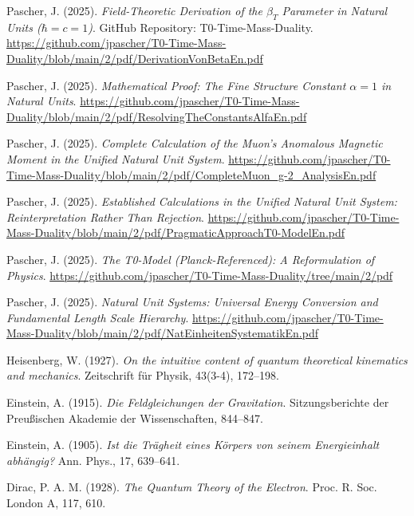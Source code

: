 \documentclass[12pt,a4paper]{article}
\theoremstyle{definition}
\begin{document}
\begin{thebibliography}{99}
		Pascher, J. (2025). 
		\textit{Field-Theoretic Derivation of the $\beta_T$ Parameter in Natural Units ($\hbar = c = 1$)}. 
		GitHub Repository: T0-Time-Mass-Duality.
		\url{https://github.com/jpascher/T0-Time-Mass-Duality/blob/main/2/pdf/DerivationVonBetaEn.pdf}
		
		Pascher, J. (2025).
		\textit{Mathematical Proof: The Fine Structure Constant $\alpha = 1$ in Natural Units}.
		\url{https://github.com/jpascher/T0-Time-Mass-Duality/blob/main/2/pdf/ResolvingTheConstantsAlfaEn.pdf}
		
		Pascher, J. (2025).
		\textit{Complete Calculation of the Muon's Anomalous Magnetic Moment in the Unified Natural Unit System}.
		\url{https://github.com/jpascher/T0-Time-Mass-Duality/blob/main/2/pdf/CompleteMuon_g-2_AnalysisEn.pdf}
		
		Pascher, J. (2025).
		\textit{Established Calculations in the Unified Natural Unit System: Reinterpretation Rather Than Rejection}.
		\url{https://github.com/jpascher/T0-Time-Mass-Duality/blob/main/2/pdf/PragmaticApproachT0-ModelEn.pdf}
		
		Pascher, J. (2025). 
		\textit{The T0-Model (Planck-Referenced): A Reformulation of Physics}. 
		\url{https://github.com/jpascher/T0-Time-Mass-Duality/tree/main/2/pdf}
		
		Pascher, J. (2025). 
		\textit{Natural Unit Systems: Universal Energy Conversion and Fundamental Length Scale Hierarchy}. 
		\url{https://github.com/jpascher/T0-Time-Mass-Duality/blob/main/2/pdf/NatEinheitenSystematikEn.pdf}
		
		Heisenberg, W. (1927). 
		\textit{On the intuitive content of quantum theoretical kinematics and mechanics}. 
		Zeitschrift für Physik, 43(3-4), 172--198.
		
		Einstein, A. (1915). 
		\textit{Die Feldgleichungen der Gravitation}. 
		Sitzungsberichte der Preußischen Akademie der Wissenschaften, 844--847.
		
		Einstein, A. (1905). 
		\textit{Ist die Trägheit eines Körpers von seinem Energieinhalt abhängig?} 
		Ann. Phys., 17, 639--641.
		
		Dirac, P. A. M. (1928). 
		\textit{The Quantum Theory of the Electron}. 
		Proc. R. Soc. London A, 117, 610.
		

\end{thebibliography}
\end{document}
